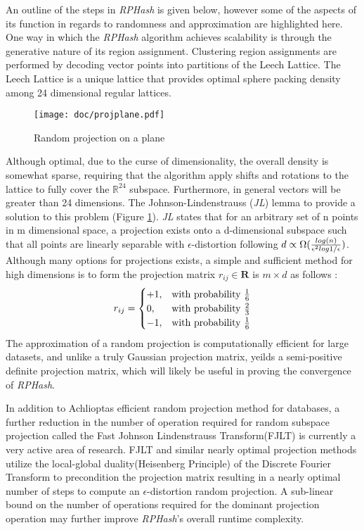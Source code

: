 \documentclass[a4paper,10pt]{article}
\begin{document}
An outline of the steps in \emph{RPHash} is given below, however some of
the aspects of its function in regards to randomness and approximation are
highlighted here.  One way in which the \emph{RPHash} algorithm achieves
scalability is through the generative nature of its region assignment.
Clustering region assignments are performed by decoding vector points
into partitions of the Leech Lattice.  The Leech Lattice is a unique
lattice that provides optimal sphere packing density among 24 dimensional
regular lattices\cite{Cohn}.  
\begin{figure}%
\centering
\texttt{[image: doc/projplane.pdf]}
\caption{Random projection on a plane\label{projplane}}
\end{figure}
Although optimal, due to the curse of
dimensionality, the overall density is somewhat sparse, requiring that the
algorithm apply shifts and rotations to the lattice to fully cover the
$\mathbb{R}^{24}$ subspace.  Furthermore, in general vectors will be greater 
than 24 dimensions.  The Johnson-Lindenstrauss (\emph{JL}) lemma to provide a
solution to
this problem (Figure \ref{projplane}).  \emph{JL} states that for an arbitrary
set of n
points in m dimensional space, a projection exists onto a d-dimensional 
subspace such that all points are linearly separable with $\epsilon$-distortion
 following 
 $d \propto {\Omega({{ log(n) }\over {\epsilon^2 log 1/\epsilon}  })}$.
 Although many options for projections exists, a simple and sufficient 
method for high dimensions is to form the projection matrix 
$r_{ij}\in\textbf{R}$ is $m\times d$ as follows\cite{Achlioptas01} :
\[
    r_{ij}= 
\begin{cases}
    +1, & \text{with probability } {1 \over 6}\\
     0, & \text{with probability } {2 \over 3}\\
    -1, & \text{with probability } {1 \over 6}\\
\end{cases}
\]
The approximation of a random projection is computationally
efficient for large datasets, and unlike a truly Gaussian projection matrix,
yeilds a semi-positive definite projection matrix, which will likely be
useful in proving the convergence of \emph{RPHash}.

In addition to Achlioptas efficient random projection method for
databases, a further reduction in the number of operation required
for random subspace projection called the Fast Johnson Lindenstrauss
Transform(FJLT)\cite{ailon2006,Dasgupta,ailon2013} is currently a very
active area of research.  FJLT and similar nearly optimal projection methods
utilize the local-global duality(Heisenberg Principle) of the Discrete
Fourier Transform to precondition the projection matrix resulting in a
nearly optimal number of steps to compute an $\epsilon$-distortion random
projection\cite{ailon2006,Dasgupta,ailon2013}.	A sub-linear bound on the
number of operations required for the dominant projection operation may
further improve \emph{RPHash}'s overall runtime complexity.
\end{document}
